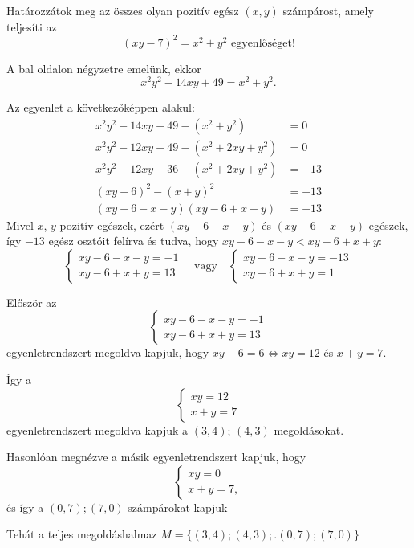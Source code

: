 \begin{problem}
	Határozzátok meg az összes olyan pozitív egész $(x,y)$
	számpárost, amely teljesíti az 
	\[
	(xy-7)^{2}=x^{2}+y^{2}\text{ egyenlőséget!}
	\]
\end{problem}
\begin{solution}
	A bal oldalon négyzetre emelünk, ekkor 
	\[
	x^{2}y^{2}-14xy+49=x^{2}+y^{2}.
	\]
	
	
	Az egyenlet a következőképpen alakul: 
	\begin{align*}
		x^{2}y^{2}-14xy+49-(x^{2}+y^{2}) & =0\\
		x^{2}y^{2}-12xy+49-(x^{2}+2xy+y^{2}) & =0\\
		x^{2}y^{2}-12xy+36-(x^{2}+2xy+y^{2}) & =-13\\
		(xy-6)^{2}-(x+y)^{2} & =-13\\
		(xy-6-x-y)(xy-6+x+y) & =-13
	\end{align*}
	Mivel $x$, $y$ pozitív egészek, ezért $(xy-6-x-y)$ és $(xy-6+x+y)$
	egészek, így $-13$ egész osztóit felírva és tudva, hogy $xy-6-x-y<xy-6+x+y$:
	\[
	\left\{ \begin{array}{l}
		xy-6-x-y=-1\\
		xy-6+x+y=13
	\end{array}\right.\quad\text{vagy}\quad\left\{ \begin{array}{l}
		xy-6-x-y=-13\\
		xy-6+x+y=1
	\end{array}\right.
	\]
	
	Először az 
	\[
	\left\{ \begin{array}{l}
		xy-6-x-y=-1\\
		xy-6+x+y=13
	\end{array}\right.
	\]
	egyenletrendszert megoldva kapjuk, hogy $xy-6=6\Leftrightarrow xy=12$
	és $x+y=7$. 
	\item[] Így a 
	\[
	\left\{ \begin{array}{l}
		xy=12\\
		x+y=7
	\end{array}\right.
	\]
	egyenletrendszert megoldva kapjuk a $(3,4)$; $(4,3)$ megoldásokat. 
	
	
	Hasonlóan megnézve a másik egyenletrendszert kapjuk, hogy 
	\[
	\left\{ \begin{array}{l}
		xy=0\\
		x+y=7,
	\end{array}\right.
	\]
	és így a $(0,7);(7,0)$ számpárokat kapjuk 
	\item[] Tehát a teljes megoldáshalmaz $M=\{(3,4);(4,3);.(0,7);(7,0)\}$ 
	
\end{solution}

